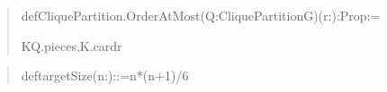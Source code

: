 \documentclass[english,11pt,a4paper]{article}
\newlength{\LeanCharWidth}
\begin{document}
\begin{quote}
\noindent \strut\par
\noindent def\hspace*{\dimexpr 1\LeanCharWidth\relax}CliquePartition.OrderAtMost\hspace*{\dimexpr 1\LeanCharWidth\relax}(Q\hspace*{\dimexpr 1\LeanCharWidth\relax}:\hspace*{\dimexpr 1\LeanCharWidth\relax}CliquePartition\hspace*{\dimexpr 1\LeanCharWidth\relax}G)\hspace*{\dimexpr 1\LeanCharWidth\relax}(r\hspace*{\dimexpr 1\LeanCharWidth\relax}:\hspace*{\dimexpr 1\LeanCharWidth\relax}{\LeanSymbols ℕ})\hspace*{\dimexpr 1\LeanCharWidth\relax}:\hspace*{\dimexpr 1\LeanCharWidth\relax}Prop\hspace*{\dimexpr 1\LeanCharWidth\relax}:=\par
\noindent \hspace*{\dimexpr 2\LeanCharWidth\relax}{\LeanSymbols ∀}\hspace*{\dimexpr 1\LeanCharWidth\relax}K\hspace*{\dimexpr 1\LeanCharWidth\relax}{\LeanSymbols ∈}\hspace*{\dimexpr 1\LeanCharWidth\relax}Q.pieces,\hspace*{\dimexpr 1\LeanCharWidth\relax}K.card\hspace*{\dimexpr 1\LeanCharWidth\relax}{\LeanSymbols ≤}\hspace*{\dimexpr 1\LeanCharWidth\relax}r\par
\end{quote}

\begin{quote}\fontsize{8.5}{10.2}\selectfont\ttfamily\raggedright\setlength{\parskip}{0pt}\settowidth{\LeanCharWidth}{0}
\noindent def\hspace*{\dimexpr 1\LeanCharWidth\relax}targetSize\hspace*{\dimexpr 1\LeanCharWidth\relax}(n\hspace*{\dimexpr 1\LeanCharWidth\relax}:\hspace*{\dimexpr 1\LeanCharWidth\relax}{\LeanSymbols ℕ})\hspace*{\dimexpr 1\LeanCharWidth\relax}:\hspace*{\dimexpr 1\LeanCharWidth\relax}{\LeanSymbols ℕ}\hspace*{\dimexpr 1\LeanCharWidth\relax}:=\hspace*{\dimexpr 1\LeanCharWidth\relax}n\hspace*{\dimexpr 1\LeanCharWidth\relax}*\hspace*{\dimexpr 1\LeanCharWidth\relax}(n\hspace*{\dimexpr 1\LeanCharWidth\relax}+\hspace*{\dimexpr 1\LeanCharWidth\relax}1)\hspace*{\dimexpr 1\LeanCharWidth\relax}/\hspace*{\dimexpr 1\LeanCharWidth\relax}6\par
\end{quote}
\end{document}
